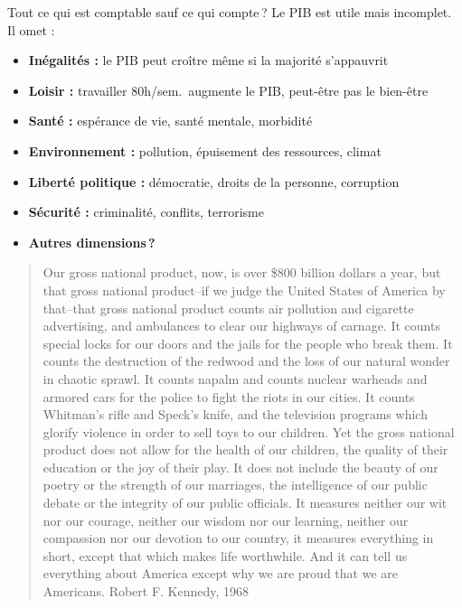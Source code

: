 \documentclass[aspectratio=169]{beamer}
\begin{document}

\begin{frame}[t]{Tout ce qui est comptable sauf ce qui compte\,?}\examtag
   \small
   Le PIB est utile mais incomplet. Il omet :
   \vspace{0.25cm}
   \begin{itemize}
      \setlength\itemsep{0.25cm}
      \item \textbf{Inégalités :} le PIB peut croître même si la majorité s'appauvrit
      \item \textbf{Loisir :} travailler 80h/sem.\ augmente le PIB, peut-être pas le bien-être
      \item \textbf{Santé :} espérance de vie, santé mentale, morbidité
      \item \textbf{Environnement :} pollution, épuisement des ressources, climat
      \item \textbf{Liberté politique :} démocratie, droits de la personne, corruption
      \item \textbf{Sécurité :} criminalité, conflits, terrorisme
      \item \textbf{Autres dimensions\,?}
   \end{itemize}
\end{frame}

\begin{frame}{}
   \small
   \begin{quotation}
      Our gross national product, now, is over \$800 billion dollars a year, but that gross national product–if we judge the United States of America by that–that gross national product counts air pollution and cigarette advertising, and ambulances to clear our highways of carnage. It counts special locks for our doors and the jails for the people who break them. It counts the destruction of the redwood and the loss of our natural wonder in chaotic sprawl. It counts napalm and counts nuclear warheads and armored cars for the police to fight the riots in our cities. It counts Whitman's rifle and Speck's knife, and the television programs which glorify violence in order to sell toys to our children. Yet the gross national product does not allow for the health of our children, the quality of their education or the joy of their play. It does not include the beauty of our poetry or the strength of our marriages, the intelligence of our public debate or the integrity of our public officials. It measures neither our wit nor our courage, neither our wisdom nor our learning, neither our compassion nor our devotion to our country, it measures everything in short, except that which makes life worthwhile. And it can tell us everything about America except why we are proud that we are Americans.
      \mbox{}\hfill{\scriptsize\textcolor{HECgray}{Robert F. Kennedy, 1968}}
   \end{quotation}
\end{frame}
\end{document}
